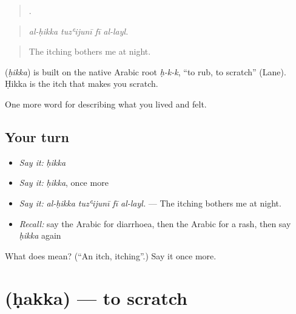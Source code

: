 \begin{quote}
   .
\end{quote}

\begin{quote}
\emph{al-ḥikka tuzʿijunī fī al-layl.}
\end{quote}

\begin{quote}
The itching bothers me at night.
\end{quote}

\begin{cousinweb}
\textbf{} (\emph{ḥikka}) is built on the native Arabic root \emph{ḥ-k-k}, \textquotedblleft{}to rub, to scratch\textquotedblright{} (Lane). Ḥikka is the itch that makes you scratch.
\end{cousinweb}

\begin{grammarlens}[title={What you've built}]
One more word for describing what you lived and felt.
\end{grammarlens}

\subsection*{Your turn}
\begin{itemize}
\raggedright
  \item \emph{Say it:} \emph{ḥikka}
  \item \emph{Say it:} \emph{ḥikka}, once more
  \item \emph{Say it:} \emph{al-ḥikka tuzʿijunī fī al-layl.} — The itching bothers me at night.
  \item \emph{Recall:} say the Arabic for diarrhoea, then the Arabic for a rash, then say \emph{ḥikka} again
\end{itemize}

\begin{tcolorbox}[breakable,colback=teal!4,colframe=teal!35!black,title={Before you move on}]
What does  mean? (\textquotedblleft{}An itch, itching\textquotedblright{}.) Say it once more.
\end{tcolorbox}
\section[\texorpdfstring{\ar{حك} (ḥakka)}{حك (ḥakka)}]{ (ḥakka) — to scratch}

\label{lesson:AR-C508-hakka}



